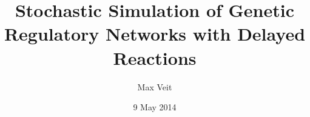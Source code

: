 \documentclass[english,letterpaper,12pt]{report}
\begin{document}
\title{Stochastic Simulation of Genetic Regulatory Networks with Delayed Reactions}
\author{Max Veit}
\date{9 May 2014}


\maketitle

\tableofcontents
\end{document}
